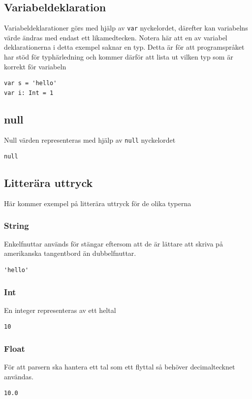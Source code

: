 \documentclass{TDP003mall}
\begin{document}
\subsection{Variabeldeklaration}
Variabeldeklarationer görs med hjälp av \texttt{var} nyckelordet, därefter kan variabelns värde ändras med endast ett likamedtecken. Notera här att en av variabel deklarationerna i detta exempel saknar en typ. Detta är för att programspråket har stöd för typhärledning och kommer därför att lista ut vilken typ som är korrekt för variabeln
\begin{verbatim}
var s = 'hello'
var i: Int = 1
\end{verbatim}

\subsection{null}
Null värden representeras med hjälp av \texttt{null} nyckelordet
\begin{verbatim}
null
\end{verbatim}

\subsection{Litterära uttryck}
Här kommer exempel på litterära uttryck för de olika typerna

\subsubsection{String}
Enkelfnuttar används för stängar eftersom att de är lättare att skriva på amerikanska tangentbord än dubbelfnuttar.
\begin{verbatim}
'hello'
\end{verbatim}

\subsubsection{Int}
En integer representeras av ett heltal
\begin{verbatim}
10
\end{verbatim}

\subsubsection{Float}
För att parsern ska hantera ett tal som ett flyttal så behöver decimaltecknet användas.
\begin{verbatim}
10.0
\end{verbatim}
\end{document}
